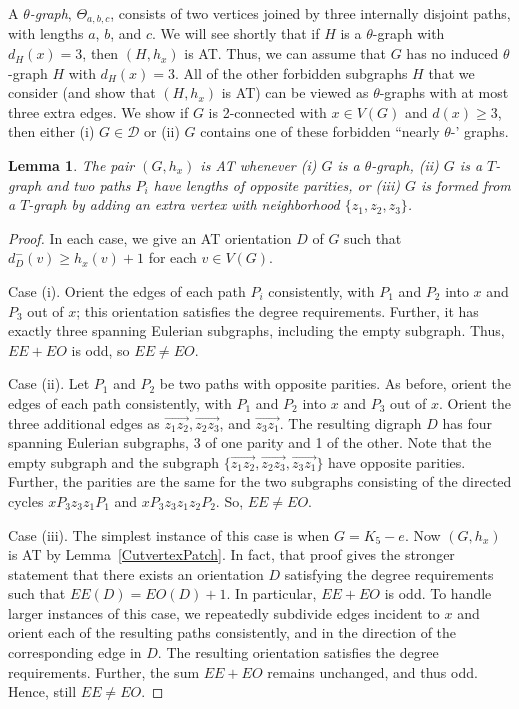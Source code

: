 \documentclass[12pt]{article}
\theoremstyle{plain}
\newtheorem{lem}[thm]{Lemma}
\theoremstyle{definition}
\theoremstyle{remark}
\newcommand{\fancy}[1]{\mathcal{#1}}
\newcommand{\D}{\fancy{D}}
\def\D{\fancy{D}}
\renewcommand{\vec}{\overrightarrow}
\begin{document}
A \emph{$\theta$-graph}, $\Theta_{a,b,c}$, consists of two vertices joined by
three internally disjoint paths, with lengths $a$, $b$, and $c$.  We will see
shortly that if $H$ is a $\theta$-graph with $d_H(x)=3$, then $(H,h_x)$ is AT.
Thus, we can assume that $G$ has no induced $\theta$-graph $H$ with $d_H(x)=3$. 
All of the other
forbidden subgraphs $H$ that we consider (and show that $(H,h_x)$ is AT) can be
viewed as $\theta$-graphs with at most three extra edges.  We show if $G$ is
2-connected with $x\in V(G)$ and $d(x)\ge 3$, then either (i) $G\in \D$ or (ii)
$G$ contains one of these forbidden ``nearly $\theta$-' graphs.

\begin{lem}
\label{ThetaReducible}
\label{TgraphReducible}
\label{T+graphReducible}
The pair $(G,h_x)$ is AT whenever (i) $G$ is a $\theta$-graph, (ii) $G$ is a
$T$-graph and two paths $P_i$ have lengths of opposite parities, or (iii) $G$ is
formed from a $T$-graph by adding an extra vertex with neighborhood
$\{z_1,z_2,z_3\}$.
\end{lem}
\begin{proof}
In each case, we give an AT orientation $D$ of $G$ such that $d_D^-(v)\ge
h_x(v)+1$ for each $v\in V(G)$.

Case (i).  Orient the edges of each path $P_i$ consistently, with $P_1$ and
$P_2$ into $x$ and $P_3$ out of $x$; this orientation satisfies the degree
requirements.  Further, it has exactly three spanning Eulerian subgraphs,
including the empty subgraph.  Thus, $EE+EO$ is odd, so $EE\ne EO$.

Case (ii).  Let $P_1$ and $P_2$ be two paths with opposite parities.  As before,
orient the edges of each path consistently, with $P_1$ and $P_2$ into $x$ and
$P_3$ out of $x$.  Orient the three additional edges as $\vec{z_1z_2},
\vec{z_2z_3}$, and $\vec{z_3z_1}$.  The resulting digraph $D$ has four spanning
Eulerian subgraphs, 3 of one parity and 1 of the other.  Note that the empty
subgraph and the subgraph $\{\vec{z_1z_2}, \vec{z_2z_3}, \vec{z_3z_1}\}$ have
opposite parities.  Further, the parities are the same for the two subgraphs
consisting of the directed cycles $xP_3z_3z_1P_1$ and $xP_3z_3z_1z_2P_2$.  So,
$EE\ne EO$.

Case (iii).  The simplest instance of this case is when $G=K_5-e$.  Now
$(G,h_x)$ is AT by Lemma~\ref{CutvertexPatch}.  In fact, that proof gives the
stronger statement that there exists an orientation $D$ satisfying the degree
requirements such that $EE(D)=EO(D)+1$.  In particular, $EE+EO$ is odd.
To handle larger instances of this case, we repeatedly subdivide edges incident
to $x$ and orient each of the resulting paths consistently, and in the direction
of the corresponding edge in $D$.  The resulting orientation satisfies the
degree requirements.  Further, the sum $EE+EO$ remains unchanged, and thus odd.
 Hence, still $EE\ne EO$.
\end{proof}
\end{document}
